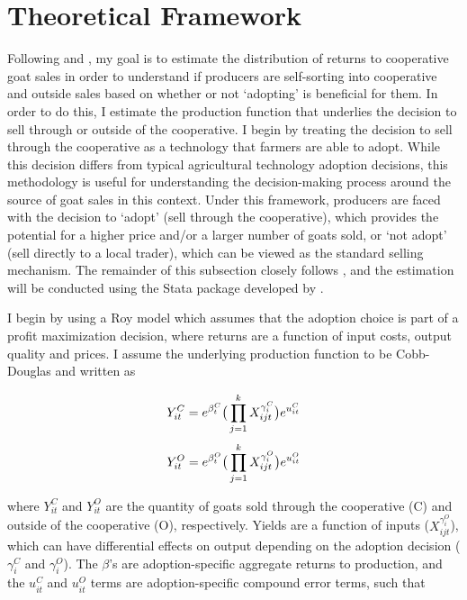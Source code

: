 \documentclass[11pt]{article}
\begin{document}
\section{Theoretical Framework} \label{sec:E2_theory}
Following \citet{michler-et.al.18} and \citet{suri11}, my goal is to estimate the distribution of returns to cooperative goat sales in order to understand if producers are self-sorting into cooperative and outside sales based on whether or not `adopting' is beneficial for them. In order to do this, I estimate the production function that underlies the decision to sell through or outside of the cooperative. I begin by treating the decision to sell through the cooperative as a technology that farmers are able to adopt. While this decision differs from typical agricultural technology adoption decisions, this methodology is useful for understanding the decision-making process around the source of goat sales in this context. Under this framework, producers are faced with the decision to `adopt' (sell through the cooperative), which provides the potential for a higher price and/or a larger number of goats sold, or `not adopt' (sell directly to a local trader), which can be viewed as the standard selling mechanism. The remainder of this subsection closely follows \citet{michler-et.al.18}, and the estimation will be conducted using the Stata package developed by \citet{cabanillas-et.al.18}.

I begin by using a Roy model which assumes that the adoption choice is part of a profit maximization decision, where returns are a function of input costs, output quality and prices. I assume the underlying production function to be Cobb-Douglas and written as

\begin{equation} \label{eq:E2_yield.C}
    Y^{C}_{it} = e^{\beta^{C}_{t}}\big{(}\prod_{j=1}^{k}X^{\gamma^{C}_{i}}_{ijt}\big{)}e^{u^{C}_{it}}
\end{equation}   
\begin{equation} \label{eq:E2_yield.O}    
    Y^{O}_{it} = e^{\beta^{O}_{t}}\big{(}\prod_{j=1}^{k}X^{\gamma^{O}_{i}}_{ijt}\big{)}e^{u^{O}_{it}}
\end{equation}

where $Y^{C}_{it}$ and $Y^{O}_{it}$ are the quantity of goats sold through the cooperative (C) and outside of the cooperative (O), respectively. Yields are a function of inputs ($X^{\gamma^{O}_{i}}_{ijt}$), which can have differential effects on output depending on the adoption decision ($\gamma^{C}_{i}$ and $\gamma^{O}_{i}$). The $\beta$’s are adoption-specific aggregate returns to production, and the $u^{C}_{it}$ and $u^{O}_{it}$ terms are adoption-specific compound error terms, such that
\end{document}
